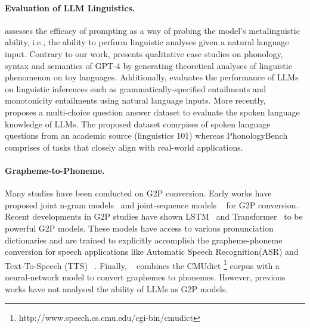 \paragraph{Evaluation of LLM Linguistics.} \citet{hu2023promptbased} assesses the efficacy of prompting as a way of probing the model's metalinguistic ability, i.e., the ability to perform linguistic analyses given a natural language input. Contrary to our work, \citep{beguš2023large} presents qualitative case studies on phonology, syntax and semantics of GPT-4 by generating theoretical analyses of linguistic phenomenon on toy languages. Additionally,  \citep{basmov2023chatgpt} evaluates the performance of LLMs on linguistic inferences such as grammatically-specified entailments and monotonicity entailments using natural language inputs. More recently, ~\cite{peng2023spoken} proposes a multi-choice question answer dataset to evaluate the spoken language knowledge of LLMs. The proposed dataset comrpises of spoken language questions from an academic source (linguistics 101) whereas PhonologyBench comprises of tasks that closely align with real-world applications.

 \paragraph{Grapheme-to-Phoneme.}
Many studies have been conducted on G2P conversion. Early works have proposed joint n-gram models~\citep{galescu2002pronunciation} and joint-sequence models ~\citep{bisani2008joint} for G2P conversion. Recent developments in G2P studies have shown LSTM~\citep{toshniwal2016jointly} and Transformer~\citep{Yolchuyeva_2019} to be powerful G2P models. These models have access to various pronunciation dictionaries and are trained to explicitly accomplish the grapheme-phoneme conversion for speech applications like Automatic Speech Recognition(ASR) and Text-To-Speech (TTS) ~\citep{masumura2020phoneme}. Finally, ~\citep{g2pE2019} combines the CMUdict \footnote{http://www.speech.cs.cmu.edu/cgi-bin/cmudict} corpus with a neural-network model to convert graphemes to phonemes. However, previous works have not analysed the ability of LLMs as G2P models.

